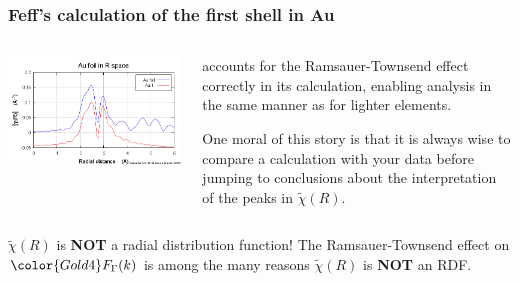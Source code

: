 \documentclass[10pt, xcolor=x11names, compress]{beamer}
\begin{document}
\begin{frame}
  \frametitle{Feff's calculation of the first shell in Au}
  \begin{columns}
    \begin{column}{0.5\linewidth}
      \includegraphics[width=\linewidth]{Au+path.png}
    \end{column}
    \begin{column}{0.5\linewidth}
      {\feff} accounts for the Ramsauer-Townsend effect correctly in
      its calculation, enabling analysis in the same manner as for
      lighter elements.

      \bigskip

      One moral of this story is that it is always wise to compare a
      {\feff} calculation with your data before jumping to conclusions
      about the interpretation of the peaks in $\tilde\chi(R)$.
    \end{column}
  \end{columns}

  \bigskip

  \begin{alertblock}{$\tilde\chi(R)$ is \textbf{NOT} a radial distribution function!}
    The Ramsauer-Townsend effect on ${\color{Gold4}F_\Gamma(k)}$ is
    among the many reasons $\tilde\chi(R)$ is \textbf{NOT} an RDF.
  \end{alertblock}
\end{frame}
\end{document}
